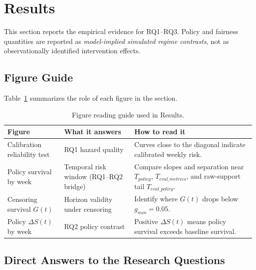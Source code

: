 \section{Results}

This section reports the empirical evidence for RQ1--RQ3. Policy and fairness quantities are reported as \textit{model-implied simulated regime contrasts}, not as observationally identified intervention effects.

\subsection{Figure Guide}

Table~\ref{tab:fig_reading_guide} summarizes the role of each figure in the section.

\begin{table}[!t]
\centering
\scriptsize
\renewcommand{\arraystretch}{1.05}
\caption{Figure reading guide used in Results.}
\label{tab:fig_reading_guide}
\begin{tabular}{@{}>{\raggedright\arraybackslash}p{}
                >{\raggedright\arraybackslash}p{}
                >{\raggedright\arraybackslash}p{}@{}}
\hline
Figure & What it answers & How to read it \\
\hline
Calibration reliability test &
RQ1 hazard quality &
Curves close to the diagonal indicate calibrated weekly risk. \\

Policy survival by week &
Temporal risk window (RQ1--RQ2 bridge) &
Compare slopes and separation near $T_{policy}$, $T_{eval\_metrics}$, and raw-support tail $T_{eval\_policy}$. \\

Censoring survival $G(t)$ &
Horizon validity under censoring &
Identify where $G(t)$ drops below $g_{min}=0.05$. \\

Policy $\Delta S(t)$ by week &
RQ2 policy contrast &
Positive $\Delta S(t)$ means policy survival exceeds baseline survival. \\
\hline
\end{tabular}
\end{table}

\subsection{Direct Answers to the Research Questions}
\label{subsec:direct_answers}

